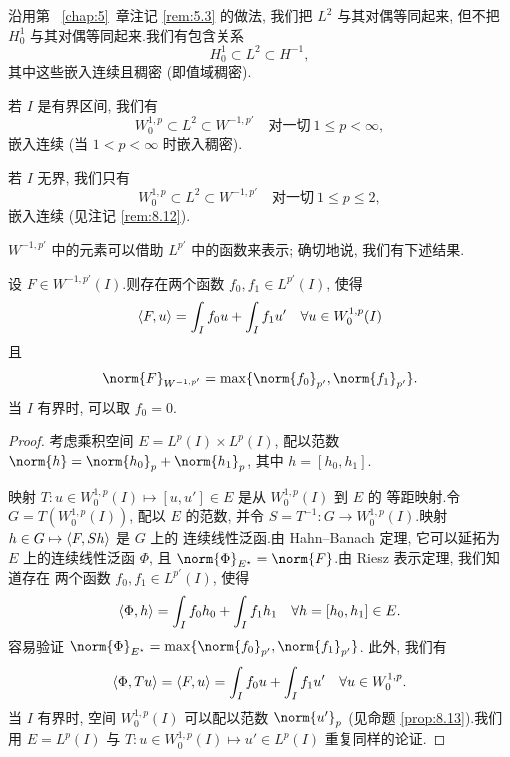 沿用第~
\ref{chap:5}~章注记 \ref{rem:5.3} 的做法, 我们把 $L^2$ 与其对偶等同起来, 但不把
$H_0^1$ 与其对偶等同起来.我们有包含关系
\begin{equation*}
H_0^1\subset L^2\subset H^{-1},
\end{equation*}
其中这些嵌入连续且稠密 (即值域稠密).

若 $I$ 是有界区间, 我们有
\begin{equation*}
W_0^{1,p}\subset L^2\subset W^{-1,p'}\quad\text{对一切}\ 1\le p<\infty,
\end{equation*}
嵌入连续 (当 $1<p<\infty$ 时嵌入稠密).

若 $I$ 无界, 我们只有
\begin{equation*}
W_0^{1,p}\subset L^2\subset W^{-1,p'}\quad\text{对一切}\ 1\le p\le2,
\end{equation*}
嵌入连续 (见注记 \ref{rem:8.12}).

$W^{-1,p'}$ 中的元素可以借助 $L^{p'}$ 中的函数来表示; 确切地说, 我们有下述结果.

\begin{proposition}
\label{prop:8.14}
设 $F\in W^{-1,p'}(I)$.则存在两个函数 $f_0,f_1\in L^{p'}(I)$, 使得
\begin{equation*}
\left\langle F,u\right\rangle=\int_I f_0u+\int_I f_1u'\quad\forall u\in W_0^{1,p}(I)
\end{equation*}
且
\begin{equation*}
\norm{F}_{W^{-1,p'}}=\max\{\norm{f_0}_{p'},\norm{f_1}_{p'}\}.
\end{equation*}
当 $I$ 有界时, 可以取 $f_0=0$.
\end{proposition}

\begin{proof}
考虑乘积空间 $E=L^p(I)\times L^p(I)$, 配以范数
$\norm{h}=\norm{h_0}_p+\norm{h_1}_p$, 其中 $h=[h_0,h_1]$.

映射 $T:u\in W_0^{1,p}(I)\mapsto[u,u']\in E$ 是从 $W_0^{1,p}(I)$ 到 $E$ 的
等距映射.令 $G=T(W_0^{1,p}(I))$, 配以 $E$ 的范数, 并令
$S=T^{-1}:G\to W_0^{1,p}(I)$.映射 $h\in G\mapsto\left\langle F,Sh\right\rangle$ 是 $G$ 上的
连续线性泛函.由 Hahn--Banach 定理, 它可以延拓为 $E$ 上的连续线性泛函
$\Phi$, 且 $\norm{\Phi}_{E^\star}=\norm{F}$.由 Riesz 表示定理, 我们知道存在
两个函数 $f_0,f_1\in L^{p'}(I)$, 使得
\begin{equation*}
\left\langle \Phi,h\right\rangle=\int_I f_0h_0+\int_I f_1h_1
\quad\forall h=[h_0,h_1]\in E.
\end{equation*}
容易验证 $\norm{\Phi}_{E^\star}=\max\{\norm{f_0}_{p'},\norm{f_1}_{p'}\}$.
此外, 我们有
\begin{equation*}
\left\langle \Phi,Tu\right\rangle=\left\langle F,u\right\rangle=\int_I f_0u+\int_I f_1u'
\quad\forall u\in W_0^{1,p}.
\end{equation*}
当 $I$ 有界时, 空间 $W_0^{1,p}(I)$ 可以配以范数 $\norm{u'}_p$ (见命题
 \ref{prop:8.13}).我们用 $E=L^p(I)$ 与
$T:u\in W_0^{1,p}(I)\mapsto u'\in L^p(I)$ 重复同样的论证.
\end{proof}

